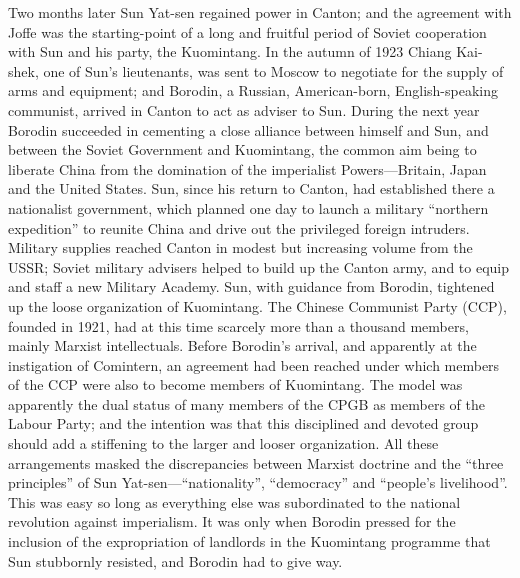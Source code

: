 Two months later Sun Yat-sen regained power in Canton; and the agreement with Joffe was the starting-point of a long and fruitful period of Soviet cooperation with Sun and his party, the Kuomintang. In the autumn of 1923 Chiang Kai-shek, one of Sun's lieutenants, was sent to Moscow to negotiate for the supply of arms and equipment; and Borodin, a Russian, American-born, English-speaking communist, arrived in Canton to act as adviser to Sun. During the next year Borodin succeeded in cementing a close alliance between himself and Sun, and between the Soviet Government and Kuomintang, the common aim being to liberate China from the domination of the imperialist Powers---Britain, Japan and the United States. Sun, since his return to Canton, had established there a nationalist government, which planned one day to launch a military ``northern expedition'' to reunite China and drive out the privileged foreign intruders. Military supplies reached Canton in modest but increasing volume from the USSR; Soviet military advisers helped to build up the Canton army, and to equip and staff a new Military Academy. Sun, with guidance from Borodin, tightened up the loose organization of Kuomintang. The Chinese Communist Party (CCP), founded in 1921, had at this time scarcely more than a thousand members, mainly Marxist intellectuals. Before Borodin's arrival, and apparently at the instigation of Comintern, an agreement had been reached under which members of the CCP were also to become members of Kuomintang. The model was apparently the dual status of many members of the CPGB as members of the Labour Party; and the intention was that this disciplined and devoted group should add a stiffening to the larger and looser organization. All these arrangements masked the discrepancies between Marxist doctrine and the ``three principles'' of Sun Yat-sen---``nationality'', ``democracy'' and ``people's livelihood''. This was easy so long as everything else was subordinated to the national revolution against imperialism. It was only when Borodin pressed for the inclusion of the expropriation of landlords in the Kuomintang programme that Sun stubbornly resisted, and Borodin had to give way. 

